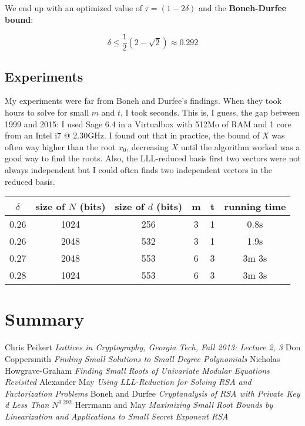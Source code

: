 \documentclass[a4paper,11pt]{article}
\begin{document}
We end up with an optimized value of $\tau = (1 - 2\delta)$ and the \textbf{Boneh-Durfee bound}:

\[ \delta \leq \frac{1}{2} (2 - \sqrt{2}) \approx 0.292 \]

\subsection{Experiments}\label{boneh-durfee-experiments}

My experiments were far from Boneh and Durfee's findings. When they took hours to solve for small $m$ and $t$, I took seconds. This is, I guess, the gap between 1999 and 2015: I used Sage 6.4 in a Virtualbox with 512Mo of RAM and 1 core from an Intel i7 @ 2.30GHz. I found out that in practice, the bound of $X$ was often way higher than the root $x_0$, decreasing $X$ until the algorithm worked was a good way to find the roots. Also, the LLL-reduced basis first two vectors were not always independent but I could often finds two independent vectors in the reduced basis.

\begin{center} 
\begin{tabular}{@{} *6c @{}}
\toprule
 $\delta$ & size of $N$ (bits) & size of $d$ (bits) & m & t & running time \\ 
\midrule
 0.26 & 1024 & 256 & 3 & 1 & 0.8s\\ 
 0.26 & 2048 & 532 & 3 & 1 & 1.9s \\
 0.27 & 2048 & 553 & 6 & 3 & 3m 3s \\
 0.28 & 1024 & 553 & 6 & 3 & 3m 3s \\
\bottomrule
\end{tabular}
\end{center} 

\section{Summary}


\newpage
\begin{thebibliography}{1}

 Chris Peikert {\em Lattices in Cryptography, Georgia Tech, Fall 2013: Lecture 2, 3}
 Don Coppersmith {\em Finding Small Solutions to Small Degree Polynomials}
 Nicholas Howgrave-Graham {\em Finding Small Roots of Univariate Modular Equations Revisited}
 Alexander May {\em Using LLL-Reduction for Solving RSA and Factorization Problems}
 Boneh and Durfee {\em Cryptanalysis of RSA with Private Key d Less Than $N^{0.292}$}
 Herrmann and May {\em Maximizing Small Root Bounds by Linearization and Applications to Small Secret Exponent RSA}


\end{thebibliography}
\end{document}
